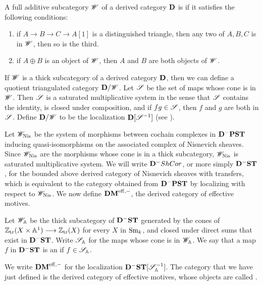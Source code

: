 \begin{defn}
A full additive subcategory $\Cat{W}$ of a derived category 
$\DCat$ is  if it satisfies the following conditions:
\begin{enumerate}
\item if $A \to B \to C \to A[1]$ is a distinguished triangle, then
any two of $A, B, C$ is in $\Cat{W}$, then so is the third.

\item if $A \oplus B$ is an object of $\Cat{W}$, then $A$ and $B$ 
are both objects of $\Cat{W}$.
\end{enumerate}
\end{defn}

If $\Cat{W}$ is a thick subcategory of a derived category $\DCat$,
then we can define a quotient triangulated category 
$\DCat/\Cat{W}$. Let $\Cat{S}$ be the set of maps whose cone is in 
$\Cat{W}$. Then $\Cat{S}$ is a saturated multiplicative system in 
the sense that $\Cat{S}$ contains the identity, is closed under 
composition, and if $fg \in \Cat{S}$, then $f$ and $g$ are both in 
$\Cat{S}$. Define $\DCat/\Cat{W}$ to be the localization 
$\DCat[D] [\Cat{S}^{-1}]$ (see \cite{Verd96}).

Let $\Cat{W}_{\Nis}$ be the system of morphisms between cochain
complexes in $\DCat^-\PST$ inducing quasi-isomorphisms on the
associated complex of Nisnevich sheaves. Since $\Cat{W}_{\Nis}$ are
the morphisms whose cone is in a thick subcategory, $\Cat{W}_{\Nis}$
is saturated multiplicative system.  We will write $\DCat^-\ShCor$, or
more simply $\DShCor$, for the bounded above derived category of
Nisnevich sheaves with transfers, which is equivalent to the category
obtained from $\DCat^- \PST$ by localizing with respect to
$\Cat{W}_{\Nis}$. We now define $\DMeff$, the derived category of 
effective motives.


\begin{defn}\label{def_DMeff}
Let $\Cat{W}_{\A}$ be the thick subcategory of $\DShCor$ generated by
the cones of $\Ztr(X \times \A^1) \to \Ztr(X)$ for every $X$ in $\Sm$,
and closed under direct sums that exist in $\DShCor$.  Write
$\Cat{S}_{\A}$ for the maps whose cone is in $\Cat{W}_{\A}$.  We say
that a map $f$ in $\DShCor$ is an  if
$f \in \Cat{S}_{\A}$.

We write $\DMeff$ for the localization 
$\DShCor [\Cat{S}_{\A}^{-1}]$. The category that we have
just defined is the derived category of effective motives, whose objects are
called .
\end{defn}

